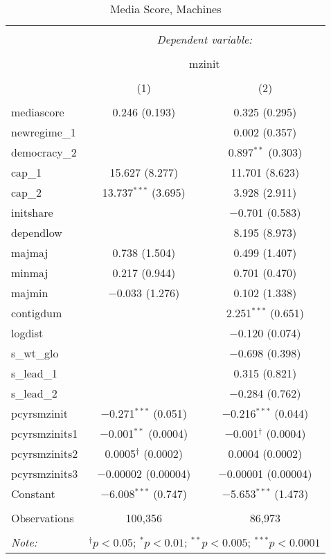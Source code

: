 
\begin{table}[!htbp] \centering 
  \caption{Media Score, Machines} 
  \label{} 
\begin{tabular}{@{\extracolsep{5pt}}lcc} 
\\[-1.8ex]\hline 
\hline \\[-1.8ex] 
 & \multicolumn{2}{c}{\textit{Dependent variable:}} \\ 
\cline{2-3} 
\\[-1.8ex] & \multicolumn{2}{c}{mzinit} \\ 
\\[-1.8ex] & (1) & (2)\\ 
\hline \\[-1.8ex] 
 mediascore & 0.246 (0.193) & 0.325 (0.295) \\ 
  newregime\_1 &  & 0.002 (0.357) \\ 
  democracy\_2 &  & 0.897$^{**}$ (0.303) \\ 
  cap\_1 & 15.627 (8.277) & 11.701 (8.623) \\ 
  cap\_2 & 13.737$^{***}$ (3.695) & 3.928 (2.911) \\ 
  initshare &  & $-$0.701 (0.583) \\ 
  dependlow &  & 8.195 (8.973) \\ 
  majmaj & 0.738 (1.504) & 0.499 (1.407) \\ 
  minmaj & 0.217 (0.944) & 0.701 (0.470) \\ 
  majmin & $-$0.033 (1.276) & 0.102 (1.338) \\ 
  contigdum &  & 2.251$^{***}$ (0.651) \\ 
  logdist &  & $-$0.120 (0.074) \\ 
  s\_wt\_glo &  & $-$0.698 (0.398) \\ 
  s\_lead\_1 &  & 0.315 (0.821) \\ 
  s\_lead\_2 &  & $-$0.284 (0.762) \\ 
  pcyrsmzinit & $-$0.271$^{***}$ (0.051) & $-$0.216$^{***}$ (0.044) \\ 
  pcyrsmzinits1 & $-$0.001$^{**}$ (0.0004) & $-$0.001$^{\dagger}$ (0.0004) \\ 
  pcyrsmzinits2 & 0.0005$^{\dagger}$ (0.0002) & 0.0004 (0.0002) \\ 
  pcyrsmzinits3 & $-$0.00002 (0.00004) & $-$0.00001 (0.00004) \\ 
  Constant & $-$6.008$^{***}$ (0.747) & $-$5.653$^{***}$ (1.473) \\ 
 \hline \\[-1.8ex] 
Observations & 100,356 & 86,973 \\ 
\hline 
\hline \\[-1.8ex] 
\textit{Note:}  & \multicolumn{2}{r}{$^{\dagger} p<0.05$; $^{*} p<0.01$; $^{**} p<0.005$; $^{***} p<0.0001$} \\ 
\end{tabular} 
\end{table} 
